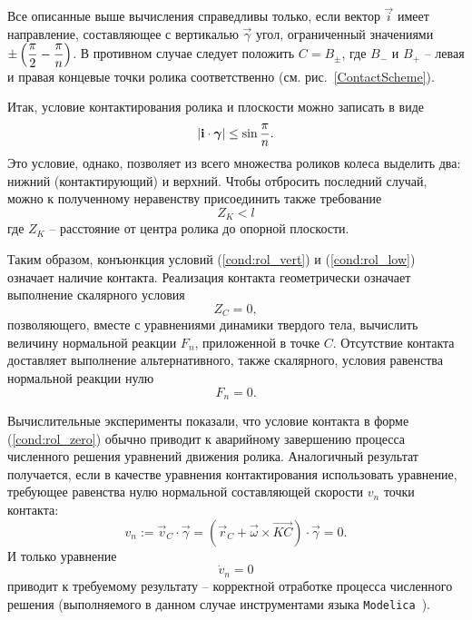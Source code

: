 Все описанные выше вычисления справедливы только, если вектор $\vec{i}$ имеет направление, составляющее с вертикалью $\vec{\gamma}$ угол, ограниченный значениями $\pm\left(\displaystyle\frac{\displaystyle \pi}{\displaystyle 2} - \displaystyle\frac{\displaystyle \pi}{\displaystyle n}\right)$. В противном случае следует положить $C = B_\pm$, где $B_{-}$ и $B_{+}$ -- левая и правая концевые точки ролика соответственно (см. рис.~\ref{ContactScheme}).

Итак, условие контактирования ролика и плоскости можно записать в виде
\begin{equation}\label{cond:rol_vert}
    \left| \boldsymbol{\mathbf{i}} \cdot \boldsymbol{\mathbf{\gamma}} \right| \le \sin\displaystyle\frac{\displaystyle \pi}{\displaystyle n}.
\end{equation}
Это условие, однако, позволяет из всего множества роликов колеса выделить два: нижний (контактирующий) и верхний. Чтобы отбросить последний случай, можно к полученному неравенству присоединить также требование 
\begin{equation}\label{cond:rol_low}
    Z_K < l
\end{equation}
где $Z_K$ -- расстояние от центра ролика до опорной плоскости.

Таким образом, конъюнкция условий (\ref{cond:rol_vert}) и (\ref{cond:rol_low}) означает наличие контакта. Реализация контакта геометрически означает выполнение скалярного условия
\begin{equation}\label{cond:rol_zero}
    Z_C = 0,
\end{equation}
позволяющего, вместе с уравнениями динамики твердого тела, вычислить величину нормальной реакции $F_n$, приложенной в точке $C$. Отсутствие контакта доставляет выполнение альтернативного, также скалярного, условия равенства нормальной реакции нулю
$$
    F_n = 0.
$$

Вычислительные эксперименты показали, что условие контакта в форме (\ref{cond:rol_zero}) обычно приводит к аварийному завершению процесса численного решения уравнений движения ролика. Аналогичный результат получается, если в качестве уравнения контактирования использовать уравнение, требующее равенства нулю нормальной составляющей скорости $v_n$ точки контакта: 
\begin{equation}\label{eq:cont_vn}
    v_n := \vec{v}_C \cdot \vec{\gamma} = \left(\vec{r}_C + \vec{\omega} \times \overrightarrow{KC}\right) \cdot \vec{\gamma} = 0.
\end{equation}
И только уравнение
\begin{equation}\label{eq:cont_Dvn}
    \dot{v}_n = 0
\end{equation}
приводит к требуемому результату -- корректной отработке процесса численного решения (выполняемого в данном случае инструментами языка \texttt{Modelica}~\cite{Fritzson}).

